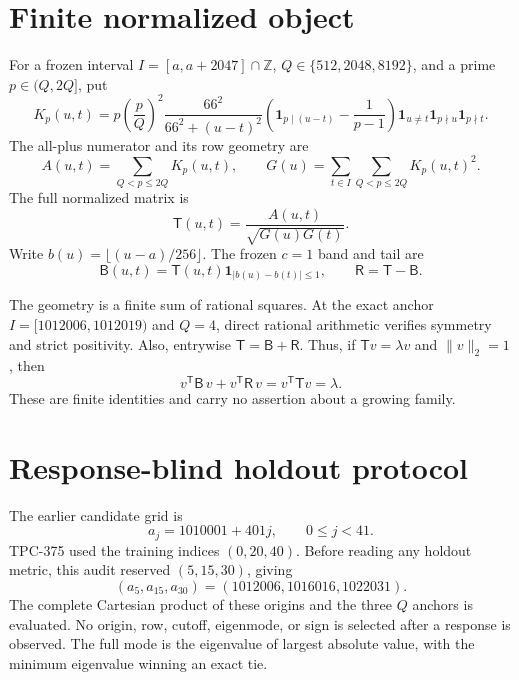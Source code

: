 \documentclass[10pt]{article}
\newcommand{\T}{\mathsf T}
\newcommand{\B}{\mathsf B}
\newcommand{\R}{\mathsf R}
\newcommand{\ind}{\mathbf 1}
\begin{document}
\section{Finite normalized object}

For a frozen interval $I=[a,a+2047]\cap\mathbb Z$, $Q\in\{512,2048,8192\}$,
and a prime $p\in(Q,2Q]$, put
\begin{equation}
 K_p(u,t)=p\left(\frac pQ\right)^2
 \frac{66^2}{66^2+(u-t)^2}
 \left(\ind_{p\mid(u-t)}-\frac{1}{p-1}\right)
 \ind_{u\ne t}\ind_{p\nmid u}\ind_{p\nmid t}.
\end{equation}
The all-plus numerator and its row geometry are
\begin{equation}
 A(u,t)=\sum_{Q<p\leq 2Q}K_p(u,t),\qquad
 G(u)=\sum_{t\in I}\sum_{Q<p\leq2Q}K_p(u,t)^2.
\end{equation}
The full normalized matrix is
\begin{equation}
 \T(u,t)=\frac{A(u,t)}{\sqrt{G(u)G(t)}}.
\end{equation}
Write $b(u)=\lfloor(u-a)/256\rfloor$.  The frozen $c=1$ band and tail are
\begin{equation}
 \B(u,t)=\T(u,t)\ind_{\lvert b(u)-b(t)\rvert\leq1},
 \qquad \R=\T-\B.
\end{equation}

The geometry is a finite sum of rational squares.  At the exact anchor
$I=[1012006,1012019)$ and $Q=4$, direct rational arithmetic verifies
symmetry and strict positivity.  Also, entrywise $\T=\B+\R$.  Thus, if
$\T v=\lambda v$ and $\|v\|_2=1$, then
\begin{equation}
 v^\mathsf{T}\B\,v+v^\mathsf{T}\R\,v
 =v^\mathsf{T}\T v=\lambda .
\end{equation}
These are finite identities and carry no assertion about a growing family.

\section{Response-blind holdout protocol}

The earlier candidate grid is
\[
 a_j=1010001+401j,\qquad 0\leq j<41.
\]
TPC-375 used the training indices $(0,20,40)$.  Before reading any holdout
metric, this audit reserved $(5,15,30)$, giving
\[
 (a_5,a_{15},a_{30})=(1012006,1016016,1022031).
\]
The complete Cartesian product of these origins and the three $Q$ anchors is
evaluated.  No origin, row, cutoff, eigenmode, or sign is selected after a
response is observed.  The full mode is the eigenvalue of largest absolute
value, with the minimum eigenvalue winning an exact tie.
\end{document}

